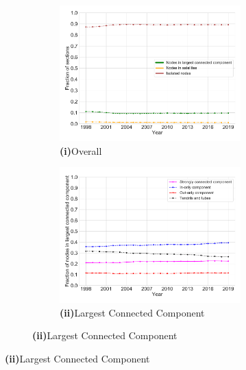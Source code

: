\documentclass[varwidth, border=0pt]{standalone}
\begin{document}
	
	\begin{figure}
	\centering
\begin{subfigure}{\linewidth}
	\begin{multicols}{2}
		\centering
		\begin{subfigure}{\linewidth}
			\includegraphics[width=\linewidth]{../../graphics/connectivity-development-statutes-only-us.pdf}
			\caption*{\textbf{\textsf{(i)}}\quad Overall}
		\end{subfigure}
		\newpage
		\begin{subfigure}{\linewidth}
			\includegraphics[width=\linewidth]{../../graphics/connectivity-lcc-statutes-only-us.pdf}
			\caption*{\textbf{\textsf{(ii)}}\quad Largest Connected Component}
		\end{subfigure}	
	\end{multicols}
	\vspace*{-6pt}
\end{subfigure}


\end{figure}
\end{document}
